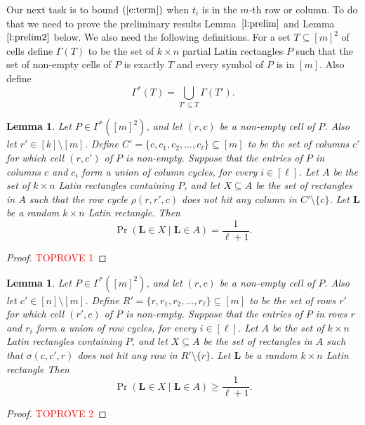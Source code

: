 \documentclass[12pt]{article}
\newtheorem{lem}[thm]{Lemma}
\theoremstyle{definition}
\numberwithin{equation}{section}
\def\eref#1{$(\ref{#1})$}
\def\lref#1{Lemma~$\ref{#1}$}
\renewcommand{\geq}{\geqslant}
\renewcommand{\L}{\mathbf{L}}
\begin{document}
	Our next task is to bound \eref{e:term} when $t_i$ is in the $m$-th row or column. To do that we need to prove the preliminary results \lref{l:prelim} and \lref{l:prelim2} below. We also need the following definitions. For a set $T \subseteq [m]^2$ of cells define $\Gamma(T)$ to be the set of $k \times n$ partial Latin rectangles $P$ such that the set of non-empty cells of $P$ is exactly $T$ and every symbol of $P$ is in $[m]$. Also define 
	\begin{equation}\label{e:Gammastar}
		\Gamma^*(T) = \bigcup_{T' \subseteq T} \Gamma(T').
	\end{equation}
	
	\begin{lem}\label{l:prelim}
		Let $P \in \Gamma^*([m]^2)$, and let $(r, c)$ be a non-empty cell of
		$P$.  Also let $r' \in [k]\setminus [m]$. Define
		$C'=\{c,c_1,c_2,\ldots,c_\ell\}\subseteq[m]$ to be the set of columns
		$c'$ for which cell $(r,c')$ of $P$ is non-empty.
		Suppose that
		the entries of $P$ in columns $c$ and $c_i$ form a union of column
		cycles, for every $i \in [\ell]$.  
		Let $A$ be the set of $k \times n$ Latin rectangles containing $P$, and
		let $X\subseteq A$ be the set of rectangles in $A$ such that
		the row cycle $\rho(r, r', c)$ does not hit any column in $C'\setminus\{c\}$.
		Let $\L$ be a random $k \times n$ Latin rectangle. Then
		\[
		\Pr(\L \in X\mid  \L \in A)=\frac1{\ell+1}.
		\]
	\end{lem}
	
	\begin{proof}\textcolor{red}{TOPROVE 1}\end{proof}
	
	
	\begin{lem}\label{l:prelim2}
		Let $P \in \Gamma^*([m]^2)$, and let $(r, c)$ be a non-empty cell of
		$P$.  Also let $c' \in [n]\setminus [m]$. Define
		$R'=\{r,r_1,r_2,\ldots,r_\ell\}\subseteq[m]$ to be the set of rows
		$r'$ for which cell $(r',c)$ of $P$ is non-empty.
		Suppose that
		the entries of $P$ in rows $r$ and $r_i$ form a union of row
		cycles, for every $i \in [\ell]$.  
		Let $A$ be the set of $k \times n$ Latin rectangles containing $P$, and
		let $X\subseteq A$ be the set of rectangles in $A$ such that
		$\sigma(c, c', r)$ does not hit any row in $R'\setminus\{r\}$.
		Let $\L$ be a random $k \times n$ Latin rectangle Then
		\[
		\Pr(\L \in X\mid  \L \in A) \geq \frac1{\ell+1}.
		\]
	\end{lem}
	
	\begin{proof}\textcolor{red}{TOPROVE 2}\end{proof}
	
\end{document}

